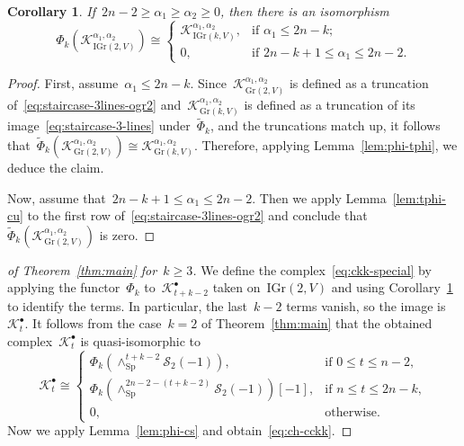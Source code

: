 \documentclass[a4paper]{article}
\newcommand{\Sp}{\mathrm{Sp}}
\newcommand{\Gr}{\mathrm{Gr}}
\newcommand{\IGr}{\mathrm{IGr}}
\newcommand{\cK}{\mathcal{K}}
\newcommand{\cS}{\mathcal{S}}
\newtheorem{corollary}[theorem]{Corollary}
\theoremstyle{remark}
\theoremstyle{definition}
\begin{document}
\begin{corollary}
\label{cor:phi-ck}
If~\(2n - 2 \ge \alpha_1 \ge \alpha_2 \ge 0\), then there is an isomorphism
\begin{equation}
	\Phi_k(\cK_{\IGr(2,V)}^{\alpha_1,\alpha_2}) \cong 
	\begin{cases}
		\cK_{\IGr(k,V)}^{\alpha_1,\alpha_2}, & \text{if \(\alpha_1 \le 2n-k\);}\\
		0, & \text{if \(2n-k+1 \le \alpha_1 \le 2n-2\).}
	\end{cases}
\end{equation}
\end{corollary}
\begin{proof}
First, assume~\(\alpha_1 \le 2n - k\).
Since~\(\cK_{\Gr(2,V)}^{\alpha_1,\alpha_2}\) is defined as a truncation of~\eqref{eq:staircase-3lines-ogr2}
and~\(\cK_{\Gr(k,V)}^{\alpha_1,\alpha_2}\) is defined as a truncation of its image~\eqref{eq:staircase-3-lines} under~\(\tilde\Phi_k\),
and the truncations match up, 
it follows that~\(\tilde\Phi_k(\cK_{\Gr(2,V)}^{\alpha_1,\alpha_2}) \cong \cK_{\Gr(k,V)}^{\alpha_1,\alpha_2}\).
Therefore, applying Lemma~\ref{lem:phi-tphi}, we deduce the claim.

Now, assume that~\(2n - k + 1 \le  \alpha_1 \le 2n - 2\).
Then we apply Lemma~\ref{lem:tphi-cu}  to the first row of~\eqref{eq:staircase-3lines-ogr2} 
and conclude that~\(\tilde\Phi_k(\cK_{\Gr(2,V)}^{\alpha_1,\alpha_2})\) is zero.
\end{proof}



\begin{proof}[of Theorem~\textup{\ref{thm:main}} for~\(k \ge 3\)]
We define the complex~\eqref{eq:ckk-special} by applying the functor~\(\Phi_k\) 
to~\(\cK_{t+k-2}^\bullet\) taken on~\(\IGr(2,V)\) and using Corollary~\ref{cor:phi-ck} to identify the terms. %
In particular, the last~\(k-2\) terms vanish, so the image is~\(\cK_{t}^\bullet\). 
It follows from the case~\(k = 2\) of Theorem~\ref{thm:main} 
that the obtained complex~\(\cK_{t}^\bullet\) is quasi-isomorphic to
\begin{equation*}
\cK_{t}^\bullet \cong
\begin{cases}
\Phi_k\left(\wedge_\Sp^{t+k-2}\cS_2(-1)\right), & \text{if~\(0 \le t \le n-2\)},\\
\Phi_k\left(\wedge_\Sp^{2n - 2 - (t+k-2)}\cS_2(-1)\right)[-1], & \text{if \(n \le t \le 2n-k\)},\\
0, & \text{otherwise}.
\end{cases}
\end{equation*}
Now we apply Lemma~\ref{lem:phi-cs} and obtain~\eqref{eq:ch-cckk}.
\end{proof}
\end{document}
